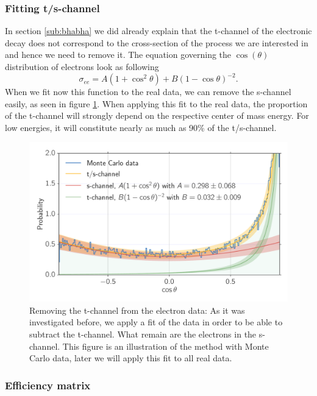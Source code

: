 \subsubsection{Fitting t/s-channel}
\label{ssub:FittingTsChannel}
In section \ref{sub:bhabha} we did already explain that the t-channel of the electronic decay does not correspond
to the cross-section of the process we are interested in and hence we need to remove it.  The equation governing 
the $\cos(\theta)$ distribution of electrons look as following
\begin{equation*}
\sigma_{ee} = A(1 + \cos^2\theta) + B(1 - \cos\theta)^{-2}.
\end{equation*}
When we fit now this function to the real data, we can remove the s-channel easily, as seen in figure \ref{fig:tschannel}.
When applying this fit to the real data, the proportion of the t-channel will strongly depend on the respective center of
mass energy. For low energies, it will constitute nearly as much as 90\% of the t/s-channel.
\begin{figure}[htpb]
    \centering
    \includegraphics[width=1.0\linewidth]{figures/tschannel}
    \caption{Removing the t-channel from the electron data: As it was investigated before,
    we apply a fit of the data in order to be able to subtract the t-channel. What remain are
    the electrons in the s-channel. This figure is an illustration of the method with Monte Carlo data, later we will
    apply this fit to all real data.}
    \label{fig:tschannel}
\end{figure}
\clearpage

\subsubsection{Efficiency matrix}
\label{ssub:Efficiencymatrix}


